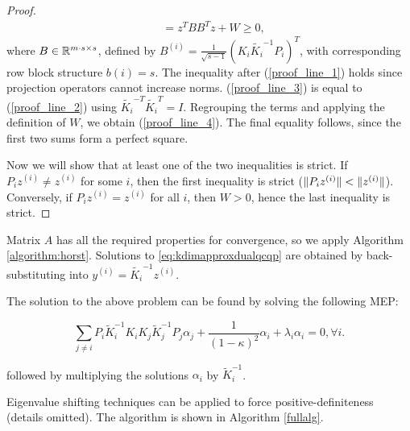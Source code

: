 \begin{proof}
\begin{align}
 &= z^T B B^T z + W \geq 0\nonumber,
\end{align}
where $B \in \mathbb{R}^{m\cdot s \times s}$, defined by $B^{(i)} = \frac{1}{\sqrt{s-1}}(K_i \widetilde{K_i}^{-1}P_i)^T$, with corresponding row block structure $b\left(i\right) = s$. The inequality after (\ref{proof_line_1}) holds since projection operators cannot increase norms.
(\ref{proof_line_3}) is equal to (\ref{proof_line_2}) using $\widetilde{K_i}^{-T}  \widetilde{K_i}^T = I$.
Regrouping the terms and applying the definition of $W$, we obtain (\ref{proof_line_4}).
The final equality follows, since the first two sums form a perfect square.

Now we will show that at least one of the two inequalities is strict. If $P_i z^{(i)} \neq z^{(i)}$ for some $i$, then the first inequality is strict ($\lVert P_i z^{(i)}\rVert < \lVert z^{(i)}\rVert$). Conversely, if $P_i z^{(i)} = z^{(i)}$ for all $i$, then $W > 0$, hence the last inequality is strict.%
\end{proof}



Matrix $A$ has all the required properties for convergence, so we
apply Algorithm \ref{algorithm:horst}. Solutions to
\eqref{eq:kdimapproxdualqcqp} are obtained by back-substituting into $y^{(i)} = \widetilde{K_i}^{-1} z^{(i)}$.



The solution to the above problem can be found by solving the following MEP:

$$\sum_{j \neq i}P_i \tilde{K}_i^{-1} K_i K_j\tilde{K}_j^{-1} P_j
\alpha_j + \frac{1}{(1-\kappa)^2}\alpha_i +  \lambda_i \alpha_i = 0,
\forall i.$$

followed by multiplying the solutions $\alpha_i$ by $\tilde{K}_i^{-1}$.

Eigenvalue shifting techniques can be applied to force positive-definiteness (details omitted).
 The algorithm is
shown in Algorithm \ref{fullalg}.


